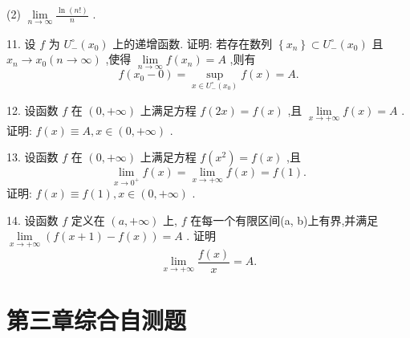 (2) \(\mathop{\lim }\limits_{{n \rightarrow  \infty }}\frac{\ln \left( {n!}\right) }{n}\) .

11. 设 \(f\) 为 \({U}_{ - }^{ \circ  }\left( {x}_{0}\right)\) 上的递增函数. 证明: 若存在数列 \(\left\{  {x}_{n}\right\}   \subset  {U}_{ - }^{ \circ  }\left( {x}_{0}\right)\) 且 \({x}_{n} \rightarrow  {x}_{0}\left( {n \rightarrow  \infty }\right)\) ,使得 \(\mathop{\lim }\limits_{{n \rightarrow  \infty }}f\left( {x}_{n}\right)  = A\) ,则有
\[
f\left( {{x}_{0} - 0}\right)  = \mathop{\sup }\limits_{{x \in  {U}_{ - }^{ \circ  }\left( {x}_{0}\right) }}f\left( x\right)  = A.
\]

12. 设函数 \(f\) 在 \(\left( {0, + \infty }\right)\) 上满足方程 \(f\left( {2x}\right)  = f\left( x\right)\) ,且 \(\mathop{\lim }\limits_{{x \rightarrow   + \infty }}f\left( x\right)  = A\) . 证明: \(f\left( x\right)  \equiv  A,x \in  \left( {0, + \infty }\right)\) .

13. 设函数 \(f\) 在 \(\left( {0, + \infty }\right)\) 上满足方程 \(f\left( {x}^{2}\right)  = f\left( x\right)\) ,且
\[
\mathop{\lim }\limits_{{x \rightarrow  {0}^{ + }}}f\left( x\right)  = \mathop{\lim }\limits_{{x \rightarrow   + \infty }}f\left( x\right)  = f\left( 1\right) .
\]
证明: \(f\left( x\right)  \equiv  f\left( 1\right) ,x \in  \left( {0, + \infty }\right)\) .

14. 设函数 \(f\) 定义在 \(\left( {a, + \infty }\right)\) 上, \(f\) 在每一个有限区间(a, b)上有界,并满足 \(\mathop{\lim }\limits_{{x \rightarrow   + \infty }}\left( {f\left( {x + 1}\right)  - f\left( x\right) }\right)  = A\) . 证明
\[
\mathop{\lim }\limits_{{x \rightarrow   + \infty }}\frac{f\left( x\right) }{x} = A.
\]

\section{第三章综合自测题}
